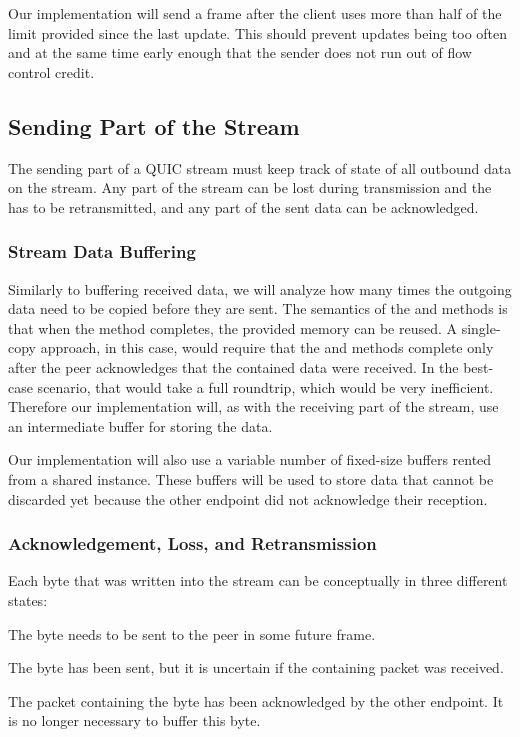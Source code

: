 Our implementation will send a \MAXSTREAMDATA{} frame after the client uses more than half of the
limit provided since the last update. This should prevent updates being too often and at the same
time early enough that the sender does not run out of flow control credit.

\subsection{Sending Part of the Stream}

The sending part of a QUIC stream must keep track of state of all outbound data on the stream. Any
part of the stream can be lost during transmission and the has to be retransmitted, and any part of
the sent data can be acknowledged.

\subsubsection{Stream Data Buffering}

Similarly to buffering received data, we will analyze how many times the outgoing data need to be
copied before they are sent. The semantics of the  and  methods is
that when the method completes, the provided memory can be reused.  A
single-copy approach, in this case, would require that the  and 
methods complete only after the peer acknowledges that the contained data were received. In the
best-case scenario, that would take a full roundtrip, which would be very inefficient. Therefore our
implementation will, as with the receiving part of the stream, use an intermediate buffer for
storing the data.

Our implementation will also use a variable number of fixed-size buffers rented from a shared
\ArrayPoolOf{\byte{}} instance. These buffers will be used to store data that cannot be discarded
yet because the other endpoint did not acknowledge their reception.

\subsubsection{Acknowledgement, Loss, and Retransmission}

Each byte that was written into the stream can be conceptually in three different states:

\begin{itemize}

   The byte needs to be sent to the peer in some future \STREAM{} frame.

   The byte has been sent, but it is uncertain if the containing packet was
received.

   The packet containing the byte has been acknowledged by the other endpoint.
It is no longer necessary to buffer this byte.

\end{itemize}

